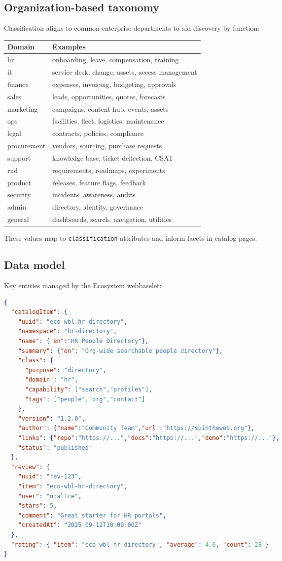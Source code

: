 \subsection{Organization-based taxonomy}
Classification aligns to common enterprise departments to aid discovery by function:
\begin{tabularx}{\linewidth}{@{}l X@{}}
  \textbf{Domain} & \textbf{Examples} \\
\hline
hr & onboarding, leave, compensation, training \\
it & service desk, change, assets, access management \\
finance & expenses, invoicing, budgeting, approvals \\
sales & leads, opportunities, quotes, forecasts \\
marketing & campaigns, content hub, events, assets \\
ops & facilities, fleet, logistics, maintenance \\
legal & contracts, policies, compliance \\
procurement & vendors, sourcing, purchase requests \\
support & knowledge base, ticket deflection, CSAT \\
rnd & requirements, roadmaps, experiments \\
product & releases, feature flags, feedback \\
security & incidents, awareness, audits \\
admin & directory, identity, governance \\
general & dashboards, search, navigation, utilities \\
\end{tabularx}

These values map to \texttt{classification} attributes and inform facets in catalog pages.

\subsection{Data model}
Key entities managed by the Ecosystem webbaselet:
\begin{lstlisting}[language=JSON,caption={Ecosystem entities}]
{
  "catalogItem": {
    "uuid": "eco-wbl-hr-directory",
    "namespace": "hr-directory",
    "name": {"en":"HR People Directory"},
    "summary": {"en": "Org-wide searchable people directory"},
    "class": {
      "purpose": "directory",
      "domain": "hr",
      "capability": ["search","profiles"],
      "tags": ["people","org","contact"]
    },
    "version": "1.2.0",
    "author": {"name":"Community Team","url":"https://spintheweb.org"},
    "links": {"repo":"https://...","docs":"https://...","demo":"https://..."},
    "status": "published"
  },
  "review": {
    "uuid": "rev-123",
    "item": "eco-wbl-hr-directory",
    "user": "u:alice",
    "stars": 5,
    "comment": "Great starter for HR portals",
    "createdAt": "2025-09-12T10:00:00Z"
  },
  "rating": { "item": "eco-wbl-hr-directory", "average": 4.6, "count": 28 }
}
\end{lstlisting}

